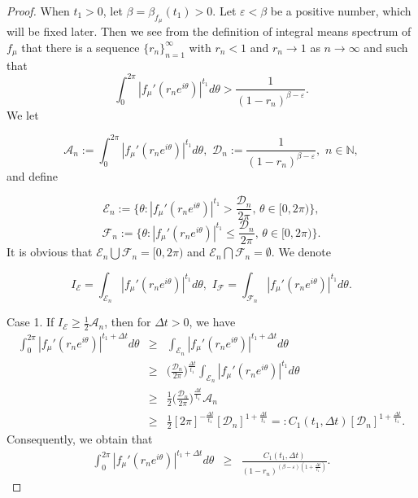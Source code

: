\documentclass[11pt]{amsart}
\theoremstyle{remark}
\theoremstyle{claim}
\theoremstyle{definition}
\theoremstyle{problem}
\theoremstyle{conjecture}
\theoremstyle{question}
\numberwithin{equation}{section}
\begin{document}
\begin{proof}
When $t_1>0$, let $\beta=\beta_{f_{\mu}}(t_1)>0$.  Let $\varepsilon<\beta$ be a positive number, which will be fixed later. Then we see from the definition of integral means spectrum of $f_{\mu}$ that  
there is a sequence $\{r_n\}_{n=1}^{\infty}$  with $r_n<1$ and $r_n \rightarrow 1$ as $n\rightarrow \infty$ and such that
\begin{equation}
\int_{0}^{2\pi} |f_{\mu}'(r_ne^{i\theta})|^{t_1} d\theta > \frac{1}{(1-r_n)^{\beta-\varepsilon}}.\nonumber
\end{equation}
We let

$$\mathcal{A}_n:=\int_{0}^{2\pi} |f_{\mu}'(r_ne^{i\theta})|^{t_1} d\theta, \, \,\mathcal{D}_n:= \frac{1}{(1-r_n)^{\beta-\varepsilon}},\,\, n\in \mathbb{N},$$
and define 

$${\mathcal{E}}_n:=\{\theta:  |f_{\mu}'(r_ne^{i\theta})|^{t_1}> \frac{\mathcal{D}_n}{2\pi}, \, \theta\in [0, 2\pi)\}, $$
$$\mathcal{F}_n:=\{\theta:  |f_{\mu}'(r_ne^{i\theta})|^{t_1}\leq \frac{\mathcal{D}_n}{2\pi},\, \theta\in [0,2\pi)\}.$$
It is obvious that $\mathcal{E}_n \bigcup \mathcal{F}_n=[0, 2\pi)$ and $\mathcal{E}_n \bigcap \mathcal{F}_n=\emptyset.$ We denote 

$$I_{\mathcal{E}}=\int_{\mathcal{E}_n} |f_{\mu}'(r_ne^{i\theta})|^{t_1} d\theta, \,\, I_{\mathcal{F}}=\int_{\mathcal{F}_n} |f_{\mu}'(r_ne^{i\theta})|^{t_1} d\theta.$$

Case 1.  If $I_{\mathcal{E}} \geq \frac{1}{2}\mathcal{A}_n$, then for $\Delta t>0$,  we have 
\begin{eqnarray}
\int_{0}^{2\pi}|f_{\mu}'(r_ne^{i\theta})|^{t_1+\Delta t} d\theta & \geq & \int_{\mathcal{E}_n}|f_{\mu}'(r_ne^{i\theta})|^{t_1+\Delta t} d\theta  \nonumber \\
& \geq & \Big(\frac{\mathcal{D}_n}{2\pi}\Big)^{\frac{\Delta t}{t_1}} \int_{\mathcal{E}_n}|f_{\mu}'(r_ne^{i\theta})|^{t_1} d\theta \nonumber \\
&\geq &\frac{1}{2} \Big(\frac{\mathcal{D}_n}{2\pi}\Big)^{\frac{\Delta t}{t_1}}\mathcal{A}_n \nonumber \\
&\geq  & \frac{1}{2}[2\pi]^{-\frac{\Delta t}{t_1}} [\mathcal{D}_n]^{1+\frac{\Delta t}{t_1}}=:C_1(t_1, \Delta t)[\mathcal{D}_n]^{1+\frac{\Delta t}{t_1}}. \nonumber
\end{eqnarray}
Consequently, we obtain that 
\begin{eqnarray}\label{i}
\int_{0}^{2\pi}|f_{\mu}'(r_ne^{i\theta})|^{t_1+\Delta t} d\theta&\geq  & \frac{ C_1(t_1, \Delta t)}{(1-r_n)^{(\beta-\varepsilon)(1+\frac{\Delta t}{t_1})}}. 
\end{eqnarray}


\end{proof}
\end{document}
